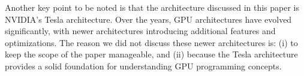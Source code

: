 \documentclass{article}
\begin{document}
Another key point to be noted is that the architecture discussed in this paper is NVIDIA's Tesla architecture. Over the years, GPU architectures have evolved significantly, with newer architectures introducing additional features and optimizations. The reason we did not discuss these newer architectures is: (i) to keep the scope of the paper manageable, and (ii) because the Tesla architecture provides a solid foundation for understanding GPU programming concepts.

\newpage
{}


\nocite{*}
\end{document}
